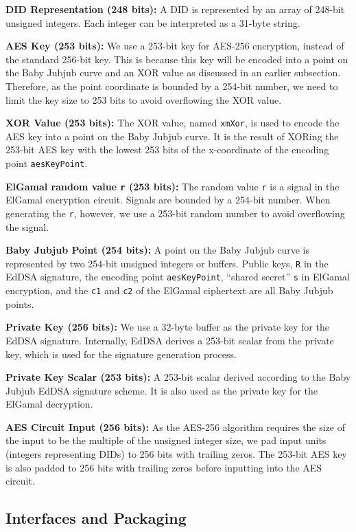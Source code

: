 \documentclass[
]{report}
\begin{document}
\textbf{DID Representation (248 bits):} A DID is represented by
an array of 248-bit unsigned integers. Each integer can be interpreted
as a 31-byte string.

\textbf{AES Key (253 bits):} We use a 253-bit key for AES-256
encryption, instead of the standard 256-bit key. This is because this
key will be encoded into a point on the Baby Jubjub curve and an XOR
value as discussed in an earlier subsection. Therefore, as the point
coordinate is bounded by a 254-bit number, we need to limit the key size
to 253 bits to avoid overflowing the XOR value.

\textbf{XOR Value (253 bits):} The XOR value, named
\texttt{xmXor}, is used to encode the AES key into a point on the Baby
Jubjub curve. It is the result of XORing the 253-bit AES key with the
lowest 253 bits of the x-coordinate of the encoding point
\texttt{aesKeyPoint}.

\textbf{ElGamal random value \texttt{r} (253 bits):} The random
value \texttt{r} is a signal in the ElGamal encryption circuit. Signals
are bounded by a 254-bit number. When generating the \texttt{r},
however, we use a 253-bit random number to avoid overflowing the signal.

\textbf{Baby Jubjub Point (254 bits):} A point on the Baby Jubjub
curve is represented by two 254-bit unsigned integers or buffers. Public
keys, \texttt{R} in the EdDSA signature, the encoding point
\texttt{aesKeyPoint}, ``shared secret'' \texttt{s} in ElGamal
encryption, and the \texttt{c1} and \texttt{c2} of the ElGamal
ciphertext are all Baby Jubjub points.

\textbf{Private Key (256 bits):} We use a 32-byte buffer as the
private key for the EdDSA signature. Internally, EdDSA derives a 253-bit
scalar from the private key, which is used for the signature generation
process.

\textbf{Private Key Scalar (253 bits):} A 253-bit scalar derived
according to the Baby Jubjub EdDSA signature scheme. It is also used as
the private key for the ElGamal decryption.

\textbf{AES Circuit Input (256 bits):} As the AES-256 algorithm
requires the size of the input to be the multiple of the unsigned
integer size, we pad input units (integers representing DIDs) to 256
bits with trailing zeros. The 253-bit AES key is also padded to 256 bits
with trailing zeros before inputting into the AES circuit.

\subsection{Interfaces and Packaging}
\end{document}
